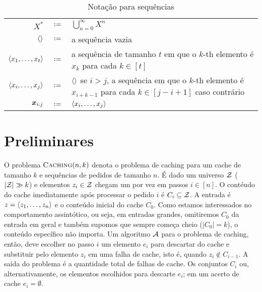 \bgroup
	\renewcommand{\arraystretch}{1.2}
	\begin{table}[htbp]
	  \caption{Notação para sequências}
          \label{tbl:seq_notation}
	  \centering
	  \begin{tabular}{r c p{13cm}}
	    \toprule
            \(X^*\)
            &\(\coloneqq\)
            & \(\bigcup_{n = 0}^\infty X^n\)\\
            \(\langle\rangle\)
            & \(\coloneqq\)
            & a sequência vazia\\
            \(\langle x_1, \dotsc, x_t\rangle\)
            & \(\coloneqq\)
            & a sequência de tamanho \(t\) em que o \(k\)-th
              elemento é \(x_k\) para cada \(k \in [t]\) \\
            \(\langle x_i, \dotsc, x_j\rangle\)
            & \(\coloneqq\)
            & \(\langle\rangle\) se \(i > j\), a sequência em que o \(k\)-th elemento
              é \(x_{i + k -1}\) para cada \(k \in [j - i + 1]\)
              caso contrário\\
            \(\bm{x}_{i:j}\)
            & \(\coloneqq\)
            & \(\langle x_i, \dotsc, x_j\rangle\)\\
            \bottomrule
	  \end{tabular}
	\end{table}
\egroup

\section{Preliminares}

O problema \(\textsc{Caching}(n,k)\) denota o problema de caching para um cache de tamanho \(k\) e sequências de pedidos de tamanho \(n\). É dado um universo \(\mathcal{Z}\) (\(|\mathcal{Z}| \gg k\)) e elementos \(z_i \in \mathcal{Z}\) chegam um por vez em passos \(i \in [n]\). O contéudo do cache imediatamente após processar o pedido \(i\) é \(C_i \subseteq \mathcal{Z}\). A entrada é \(z = \langle z_1, \dotsc, z_n\rangle\) e o conteúdo inicial do cache \(C_0\). Como estamos interessados no comportamento assintótico, ou seja, em entradas grandes, omitiremos \(C_0\) da entrada em geral e também supomos que sempre começa cheio (\(|C_0| = k\)), o conteúdo específico não importa. Um algoritmo \(\mathcal{A}\) para o problema de caching, então, deve escolher no passo \(i\) um elemento \(e_i\) para descartar do cache e substituir pelo elemento \(z_i\) em uma falha de cache, isto é, quando \(z_i \notin C_{i-1}\). A saída do problema é a quantidade total de falhas de cache. Os conjuntos \(C_i\) ou, alternativamente, os elementos escolhidos para descarte \(e_i\); em um acerto de cache \(e_i = \emptyset\).

